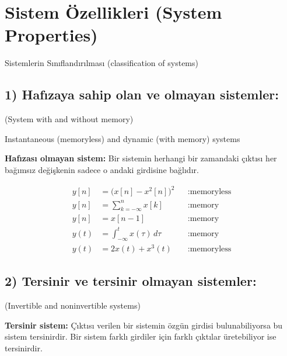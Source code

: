\documentclass[11pt,a4paper]{article}
\begin{document}
\section{Sistem Özellikleri (System Properties)}
Sistemlerin Sınıflandırılması (classification of systems)

\subsection{1) Hafızaya sahip olan ve olmayan sistemler:}
(System with and without memory)

Instantaneous (memoryless) and dynamic (with memory) systems

\textbf{Hafızası olmayan sistem:} Bir sistemin herhangi bir zamandaki çıktısı her bağımsız değişkenin sadece o andaki girdisine bağlıdır.

\begin{ornek}[(Ex)]
\begin{align*}
  y[n] &= \bigl(x[n] - x^2[n]\bigr)^2 &&: \text{memoryless} \\
  y[n] &= \sum_{k=-\infty}^{n} x[k] &&: \text{memory} \\
  y[n] &= x[n-1] &&: \text{memory} \\
  y(t) &= \int_{-\infty}^{t} x(\tau)\,d\tau &&: \text{memory} \\
  y(t) &= 2x(t) + x^3(t) &&: \text{memoryless}
\end{align*}
\end{ornek}

\subsection{2) Tersinir ve tersinir olmayan sistemler:}
(Invertible and noninvertible systems)

\textbf{Tersinir sistem:} Çıktısı verilen bir sistemin özgün girdisi bulunabiliyorsa bu sistem tersinirdir.
Bir sistem farklı girdiler için farklı çıktılar üretebiliyor ise tersinirdir.

\begin{center}
\end{center}
\end{document}
